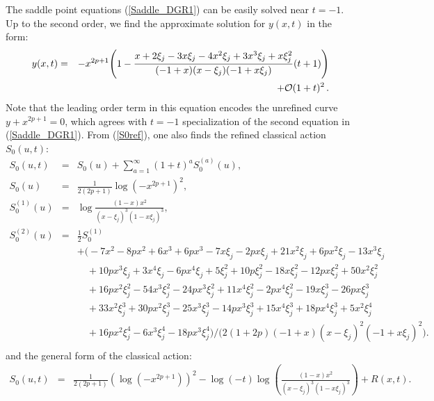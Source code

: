 \documentclass[hyper,letterpaper]{JHEP3}
\begin{document}
The saddle point equations (\ref{Saddle_DGR1}) can be easily solved near $t=-1$.
Up to the second order, we find the approximate solution for $y(x,t)$ in the form:
\begin{eqnarray}
y(x,t)&=&-x^{2 p + 1} \Biggl(
1-\frac{x + 2 \xi_j - 3 x \xi_j - 4 x^2 \xi_j + 3 x^3 \xi_j + x \xi_j^2} {(-1 + x) (x - \xi_j) (-1 + x \xi_j)}(t+1)
\Biggr)
\nonumber \\
&&+{\cal O}(1+t)^2 \,.
\end{eqnarray}
Note that the leading order term in this equation encodes the unrefined curve $y+x^{2p+1}=0$, which agrees with $t=-1$ specialization of the second equation in (\ref{Saddle_DGR1}).
{}From (\ref{S0ref}), one also finds the refined classical action $S_0(u,t)$:
\begin{eqnarray}
S_0(u,t)&=&S_0(u)+\sum_{a=1}^{\infty}(1+t)^aS_0^{(a)}(u),
\nonumber \\
S_0(u)&=&\frac{1}{2(2p+1)}\log(-x^{2p+1})^2,
\nonumber \\
S_0^{(1)}(u)&=&\log\frac{(1-x)x^2}{(x-\xi_j)^3(1-x\xi_j)^3},
\nonumber \\
S_0^{(2)}(u)&=&\frac{1}{2}S_0^{(1)}
\nonumber \\
&&
+
\bigl(
-7 x^2 - 8 p x^2 + 6 x^3 + 6 p x^3 - 7 x \xi_j - 2 p x \xi_j +
 21 x^2 \xi_j + 6 p x^2 \xi_j - 13 x^3 \xi_j
\nonumber \\
&&\quad
+ 10 p x^3 \xi_j +
 3 x^4 \xi_j - 6 p x^4 \xi_j + 5 \xi_j^2 + 10 p \xi_j^2 -
 18 x \xi_j^2 - 12 p x \xi_j^2 + 50 x^2 \xi_j^2
\nonumber \\
&&\quad
+ 16 p x^2 \xi_j^2 -
 54 x^3 \xi_j^2 - 24 p x^3 \xi_j^2 + 11 x^4 \xi_j^2 -
 2 p x^4 \xi_j^2 - 19 x \xi_j^3 - 26 p x \xi_j^3
\nonumber \\
&&\quad
+ 33 x^2 \xi_j^3 +
 30 p x^2 \xi_j^3 - 25 x^3 \xi_j^3 - 14 p x^3 \xi_j^3 +
 15 x^4 \xi_j^3 + 18 p x^4 \xi_j^3 + 5 x^2 \xi_j^4
\nonumber \\
&&\quad
+  16 p x^2 \xi_j^4
- 6 x^3 \xi_j^4 - 18 p x^3 \xi_j^4
\bigr)
/\bigl(2(1 + 2 p) (-1 + x) (x - \xi_j)^2 (-1 + x \xi_j)^2\bigr).
\nonumber \\
&&
\end{eqnarray}
and the general form of the classical action:
\begin{eqnarray}
S_0(u,t)&=&\frac{1}{2(2p+1)}\left(\log(-x^{2p+1})\right)^2-\log(-t)
 \log\left(\frac{(1-x)x^2}{(x-\xi_j)^3(1-x\xi_j)^3}\right)+R(x,t).
\nonumber \\
&&
\end{eqnarray}
\end{document}
